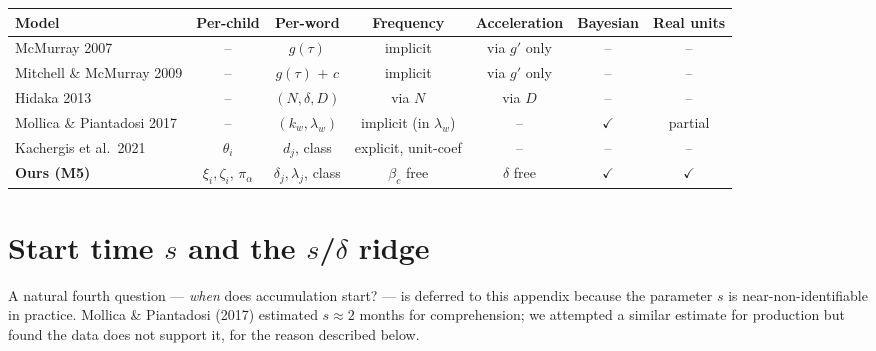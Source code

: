 \documentclass[11pt]{article}
\begin{document}
\begin{center}
\small
\begin{tabular}{@{}lcccccc@{}}
\toprule
Model & Per-child & Per-word & Frequency & Acceleration & Bayesian & Real units \\
\midrule
McMurray 2007            & --      & \(g(\tau)\)         & implicit          & via \(g'\) only & --     & --     \\
Mitchell \& McMurray 2009 & --      & \(g(\tau)\) + \(c\)  & implicit          & via \(g'\) only & --     & --     \\
Hidaka 2013              & --      & \((N, \delta, D)\)  & via \(N\)         & via \(D\)       & --     & --     \\
Mollica \& Piantadosi 2017 & --      & \((k_w, \lambda_w)\) & implicit (in \(\lambda_w\)) & --     & \(\checkmark\) & partial \\
Kachergis et al.\ 2021   & \(\theta_i\) & \(d_j\), class    & explicit, unit-coef & --      & --     & --     \\
\textbf{Ours (M5)}       & \(\xi_i, \zeta_i\), \(\pi_\alpha\) & \(\delta_j, \lambda_j\), class & \(\beta_c\) free & \(\delta\) free & \(\checkmark\) & \(\checkmark\) \\
\bottomrule
\end{tabular}
\end{center}

\appendix

\section{Start time \(s\) and the \(s\)/\(\delta\) ridge}
\label{sec:s-non-id}

A natural fourth question — \emph{when} does accumulation start? — is
deferred to this appendix because the parameter \(s\) is
near-non-identifiable in practice. Mollica \& Piantadosi (2017)
estimated \(s \approx 2\) months for comprehension; we attempted a
similar estimate for production but found the data does not support
it, for the reason described below.
\end{document}
